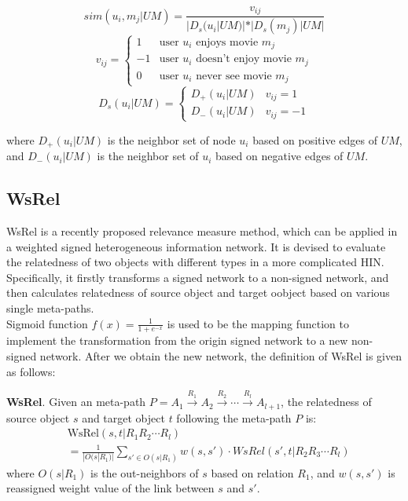 \documentclass{acm_proc_article-csis8101}
\begin{document}
\begin{equation}
sim(u_{i}, m_{j}|UM) = \frac{v_{ij}}{|D_{s}(u_{i}|UM)|*|D_{s}(m_{j})|UM|}
\end{equation}
\begin{equation}
v_{ij}=
\begin{cases}
1& \text{user } u_{i} \text{ enjoys movie } m_{j}\\
-1& \text{user } u_{i} \text{ doesn't enjoy movie } m_{j}\\
0& \text{user } u_{i} \text{ never see movie } m_{j}
\end{cases}
\end{equation}
\begin{equation}
D_{s}(u_{i}|UM)=
\begin{cases}
D_{+}(u_{i}|UM)& v_{ij} = 1 \\
D_{-}(u_{i}|UM)& v_{ij} = -1
\end{cases}
\end{equation}

where $D_{+}(u_{i}|UM)$ is the neighbor set of node $u_{i}$ based on positive edges of $UM$, and $D_{-}(u_{i}|UM)$ is the neighbor set of $u_{i}$ based on negative edges of $UM$.
\subsection{WsRel}

WsRel \cite{zhu2017measuring} is a recently proposed relevance measure method, which can be applied in a weighted signed heterogeneous information network. It is devised to evaluate the relatedness of two objects with different types in a more complicated HIN. Specifically, it firstly transforms a signed network to a non-signed network, and then calculates relatedness of source object and target oobject based on various single meta-paths.\\

Sigmoid function $f(x)=\frac{1}{1+e^{-x}}$ is used to be the mapping function to implement the transformation from the origin signed network to a new non-signed network. After we obtain the new network, the definition of WsRel is given as follows:

\begin{definition}
{\bf WsRel}. Given an meta-path $P=A_{1}\xrightarrow{R_{1}}A_{2}\xrightarrow{R_{2}}\cdots \xrightarrow{R_{l}}A_{l+1}$, the relatedness of source object $s$ and target object $t$ following the meta-path $P$ is:
\begin{equation}
\begin{split}
& \text{WsRel}(s, t|R_{1} R_{2} \cdots R_{l})\\ & = \frac{1}{|O(s|R_{1})|}\sum\limits_{s' \in O(s|R_{1})} w(s, s') \cdot WsRel(s', t|R_{2} R_{3} \cdots R_{l})
\end{split}
\end{equation}
where $O(s|R_{1})$ is the out-neighbors of  $s$ based on relation $R_{1}$, and $w(s, s')$ is reassigned weight value of the link between $s$ and $s'$. 
\end{definition}
\end{document}
